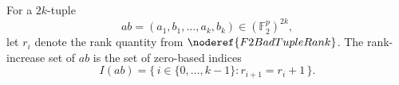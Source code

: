 \begin{definition}
For a \(2k\)-tuple
\[
  ab=(a_1,b_1,\ldots,a_k,b_k)\in(\mathbb F_2^p)^{2k},
\]
let \(r_i\) denote the rank quantity from \(\noderef{F2BadTupleRank}\). The
rank-increase set of \(ab\) is the set of zero-based indices
\[
  I(ab)=\{\,i\in\{0,\ldots,k-1\}: r_{i+1}=r_i+1\,\}.
\]
\end{definition}
